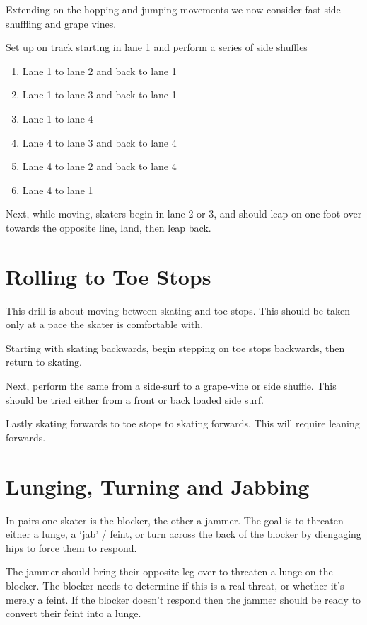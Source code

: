 \documentclass{journal}
\begin{document}
Extending on the hopping and jumping movements we now consider fast side shuffling and grape vines.  

Set up on track starting in lane 1 and perform a series of side shuffles 
\begin{enumerate}
\item Lane 1 to lane 2 and back to lane 1 
\item Lane 1 to lane 3 and back to lane 1
\item Lane 1 to lane 4 
\item Lane 4 to lane 3 and back to lane 4
\item Lane 4 to lane 2 and back to lane 4
\item Lane 4 to lane 1 
\end{enumerate}

Next, while moving, skaters begin in lane 2 or 3, and should leap on one foot over towards the opposite line, land, then leap back.   


\section*{Rolling to Toe Stops}
\label{drill:toe_stop:rolling}

This drill is about moving between skating and toe stops.
This should be taken only at a pace the skater is comfortable with.

Starting with skating backwards, begin stepping on toe stops backwards, then return to skating. 

Next, perform the same from a side-surf to a grape-vine or side shuffle. 
This should be tried either from a front or back loaded side surf.

Lastly skating forwards to toe stops to skating forwards. This will require leaning forwards. 

\section*{Lunging, Turning and Jabbing}
\label{drill:static_block:lunge}

In pairs one skater is the blocker, the other a jammer. 
The goal is to threaten either a lunge, a `jab' / feint, or turn across the back of the blocker by diengaging hips to force them to respond.

The jammer should bring their opposite leg over to threaten a lunge on the blocker.
The blocker needs to determine if this is a real threat, or whether it's merely a feint.
If the blocker doesn't respond then the jammer should be ready to convert their feint into a lunge. 
\end{document}

